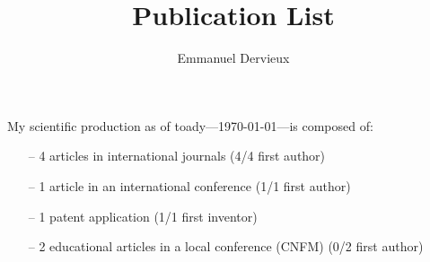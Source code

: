 \documentclass[a4paper, 11pt]{article}
\title{Publication List}
\author{Emmanuel Dervieux}
\date{}
\begin{document}
	\maketitle
	\nocite{dervieux2020, dervieux2022, madec2022, dervieux2023rate, werling2024, dervieux2024newcas, dervieux2024phase, dervieux2024patent}
	
	My scientific production as of toady---\today---is composed of:
	\begin{itemize}
		\item[--] 4 articles in international journals\cite{dervieux2020, dervieux2022, dervieux2023rate, dervieux2024phase} (4/4 first author)
		\item[--] 1 article in an international conference\cite{dervieux2024newcas} (1/1 first author)
		\item[--] 1 patent application\cite{dervieux2024patent} (1/1 first inventor)
		\item[--] 2 educational articles in a local conference (CNFM)\cite{madec2022, werling2024} (0/2 first author)
	\end{itemize}
	
	
	\printbibliography
	
\end{document}

